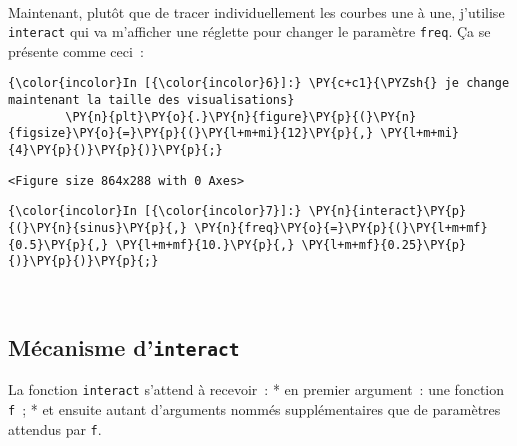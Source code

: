     \begin{center}
    \end{center}
    { \hspace*{\fill} \\}
    
    Maintenant, plutôt que de tracer individuellement les courbes une à une,
j'utilise \texttt{interact} qui va m'afficher une réglette pour changer
le paramètre \texttt{freq}. Ça se présente comme ceci~:

    \begin{Verbatim}[commandchars=\\\{\}]
{\color{incolor}In [{\color{incolor}6}]:} \PY{c+c1}{\PYZsh{} je change maintenant la taille des visualisations}
        \PY{n}{plt}\PY{o}{.}\PY{n}{figure}\PY{p}{(}\PY{n}{figsize}\PY{o}{=}\PY{p}{(}\PY{l+m+mi}{12}\PY{p}{,} \PY{l+m+mi}{4}\PY{p}{)}\PY{p}{)}\PY{p}{;}
\end{Verbatim}


    
    \begin{verbatim}
<Figure size 864x288 with 0 Axes>
    \end{verbatim}

    
    \begin{Verbatim}[commandchars=\\\{\}]
{\color{incolor}In [{\color{incolor}7}]:} \PY{n}{interact}\PY{p}{(}\PY{n}{sinus}\PY{p}{,} \PY{n}{freq}\PY{o}{=}\PY{p}{(}\PY{l+m+mf}{0.5}\PY{p}{,} \PY{l+m+mf}{10.}\PY{p}{,} \PY{l+m+mf}{0.25}\PY{p}{)}\PY{p}{)}\PY{p}{;}
\end{Verbatim}


    \begin{center}
    \end{center}
    { \hspace*{\fill} \\}
    
    \hypertarget{muxe9canisme-dinteract}{%
\subsection{\texorpdfstring{Mécanisme
d'\texttt{interact}}{Mécanisme d'interact}}\label{muxe9canisme-dinteract}}

    La fonction \texttt{interact} s'attend à recevoir~: * en premier
argument~: une fonction \texttt{f}~; * et ensuite autant d'arguments
nommés supplémentaires que de paramètres attendus par \texttt{f}.

